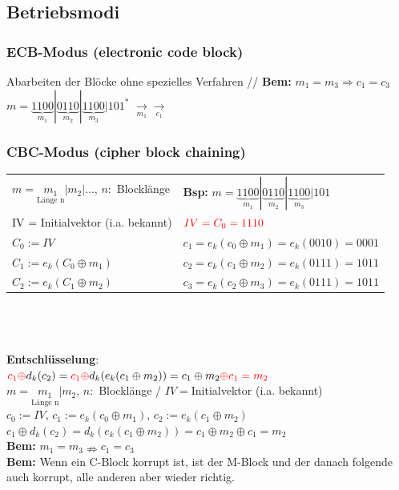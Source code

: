 \documentclass[10pt]{article}
\newcommand{\Bold}[1]{\textbf{#1}} %
\newcommand{\T}[1]{\text{#1}} %
\newcommand{\Ra}{\Rightarrow}
\newcommand{\Unten}[2]{\underset{#1}{#2}} %
\begin{document}
\subsection{Betriebsmodi}
\subsubsection{ECB-Modus (electronic code block)}
Abarbeiten der Blöcke ohne spezielles Verfahren {\color{gray} // \Bold{Bem:} $m_1=m_3\Ra c_1=c_3$} \\
 $m=\underbrace{1100}_{m_1}|\underbrace{0110}_{m_2}|\underbrace{1100}_{m_3}|101^*$ $\Unten{m_1}{\longrightarrow}$$\Unten{c_1}{\longrightarrow}$ 
\subsubsection{CBC-Modus (cipher block chaining)}
\begin{tabular}{p{7.5cm}  l}
	$m=\Unten{\T{Länge n}}{m_1}|m_2|\dots$, $n:$ Blocklänge &\Bold{Bsp:} $m=\underbrace{1100}_{m_1} | \underbrace{0110}_{m_2} | \underbrace{1100}_{m_3} | 101$ \\
	{\color{red}IV = Initialvektor} (i.a. bekannt) &  $\color{red}IV=C_0=1110$  \\
	$C_0 := IV$ & $c_1 = e_k(c_0 \oplus m_1) = e_k(0010) = 0001$ \\
	$C_1 := e_k(C_0 \oplus m_1)$ & $c_2 = e_k(c_1 \oplus m_2) = e_k(0111) = 1011$ \\
	$C_2 := e_k(C_1 \oplus m_2)$  & $c_3 = e_k(c_2 \oplus m_3) = e_k(0111) = 1011$ \\
\end{tabular} \\ \\ \\
 \textbf{Entschlüsselung}:  \\
 ${\color{red}c_1\oplus} d_k(c_2)={\color{red}c_1\oplus}d_k(e_k(c_1\oplus m_2))= c_1\oplus m_2 {\color{red}\oplus c_1 = m_2}$ \\
 $m=\Unten{\T{Länge n}}{m_1}|m_2$, $n:$ Blocklänge / $IV=$Initialvektor (i.a. bekannt)\\
 $c_0:=IV$, $c_1:=e_k(c_0\oplus m_1)$, $c_2:=e_k(c_1\oplus m_2)$\\
 $c_1\oplus d_k(c_2)=d_k(e_k(c_1\oplus m_2))=c_1\oplus m_2\oplus c_1=m_2$ \\
 \Bold{Bem:} $m_1=m_3\nRightarrow c_1=c_3$\\
 \Bold{Bem:} Wenn ein C-Block korrupt ist, ist der M-Block und der danach folgende auch korrupt, alle anderen aber wieder richtig.
\end{document}
